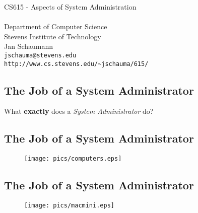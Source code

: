 \documentclass[xga]{xdvislides}
\begin{document}
\setfontphv

\lhead{\slidetitle}				%
\cfoot{\relax}					%
\rfoot{\Gray{\today}}

\vspace*{\fill}
\begin{center}
	\Hugesize
		CS615 - Aspects of System Administration\\ [1em]
	\hspace*{5mm}\blueline\\ [1em]
	\Normalsize
		Department of Computer Science\\
		Stevens Institute of Technology\\
		Jan Schaumann\\
		\verb+jschauma@stevens.edu+ \\
		\verb+http://www.cs.stevens.edu/~jschauma/615/+
\end{center}
\vspace*{\fill}

\subsection{The Job of a System Administrator}
What {\bf exactly} does a {\em System Administrator} do?

\subsection{The Job of a System Administrator}
\begin{figure}[hb]
	\begin{center}
		\texttt{[image: pics/computers.eps]} \\
	\end{center}
\end{figure}

\subsection{The Job of a System Administrator}
\vspace*{\fill}
\begin{figure}[hb]
	\begin{center}
		\texttt{[image: pics/macmini.eps]} \\
	\end{center}
\end{figure}
\vspace*{\fill}
\end{document}
